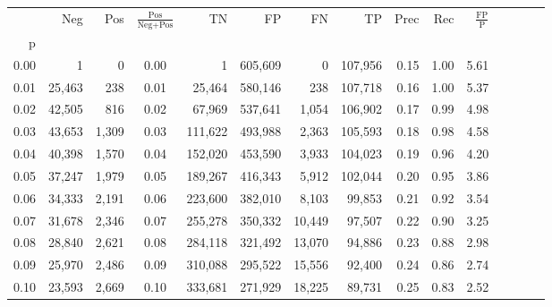 \begin{tabular}{rrrcrrrrrrrrrrr}
\toprule
{} &     Neg &    Pos & $\frac{\text{Pos}}{\text{Neg}+\text{Pos}}$ &       TN &       FP &       FN &       TP &  Prec &   Rec & $\frac{\text{FP}}{\text{P}}$ \\
p    &         &        &                                            &          &          &          &          &       &       &                              \\
\midrule
0.00 &       1 &      0 &                                       0.00 &        1 &  605,609 &        0 &  107,956 &  0.15 &  1.00 &                         5.61 \\
0.01 &  25,463 &    238 &                                       0.01 &   25,464 &  580,146 &      238 &  107,718 &  0.16 &  1.00 &                         5.37 \\
0.02 &  42,505 &    816 &                                       0.02 &   67,969 &  537,641 &    1,054 &  106,902 &  0.17 &  0.99 &                         4.98 \\
0.03 &  43,653 &  1,309 &                                       0.03 &  111,622 &  493,988 &    2,363 &  105,593 &  0.18 &  0.98 &                         4.58 \\
0.04 &  40,398 &  1,570 &                                       0.04 &  152,020 &  453,590 &    3,933 &  104,023 &  0.19 &  0.96 &                         4.20 \\
0.05 &  37,247 &  1,979 &                                       0.05 &  189,267 &  416,343 &    5,912 &  102,044 &  0.20 &  0.95 &                         3.86 \\
0.06 &  34,333 &  2,191 &                                       0.06 &  223,600 &  382,010 &    8,103 &   99,853 &  0.21 &  0.92 &                         3.54 \\
0.07 &  31,678 &  2,346 &                                       0.07 &  255,278 &  350,332 &   10,449 &   97,507 &  0.22 &  0.90 &                         3.25 \\
0.08 &  28,840 &  2,621 &                                       0.08 &  284,118 &  321,492 &   13,070 &   94,886 &  0.23 &  0.88 &                         2.98 \\
0.09 &  25,970 &  2,486 &                                       0.09 &  310,088 &  295,522 &   15,556 &   92,400 &  0.24 &  0.86 &                         2.74 \\
0.10 &  23,593 &  2,669 &                                       0.10 &  333,681 &  271,929 &   18,225 &   89,731 &  0.25 &  0.83 &                         2.52 \\

\end{tabular}
